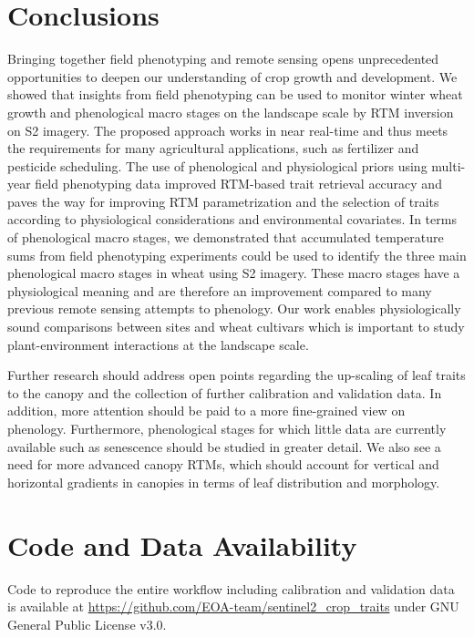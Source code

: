 \section{Conclusions}
\label{sec:conclusions}
% 
Bringing together field phenotyping and remote sensing opens unprecedented opportunities to deepen our understanding of crop growth and development.
We showed that insights from field phenotyping can be used to monitor winter wheat growth and phenological macro stages on the landscape scale by RTM inversion on S2 imagery. The proposed approach works in near real-time and thus meets the requirements for many agricultural applications, such as fertilizer and pesticide scheduling. The use of phenological and physiological priors using multi-year field phenotyping data improved RTM-based trait retrieval accuracy and paves the way for improving RTM parametrization and the selection of traits according to physiological considerations and environmental covariates. In terms of phenological macro stages, we demonstrated that accumulated temperature sums from field phenotyping experiments could be used to identify the three main phenological macro stages in wheat using S2 imagery. These macro stages have a physiological meaning and are therefore an improvement compared to many previous remote sensing attempts to phenology. Our work enables physiologically sound comparisons between sites and wheat cultivars which is important to study plant-environment interactions at the landscape scale.

Further research should address open points regarding the up-scaling of leaf traits to the canopy and the collection of further calibration and validation data. In addition, more attention should be paid to a more fine-grained view on phenology. Furthermore, phenological stages for which little data are currently available such as senescence should be studied in greater detail. We also see a need for more advanced canopy RTMs, which should account for vertical and horizontal gradients in canopies in terms of leaf distribution and morphology.

\section*{Code and Data Availability}
\label{sec:code-data-availability}
Code to reproduce the entire workflow including calibration and validation data is available at \url{https://github.com/EOA-team/sentinel2_crop_traits} under GNU General Public License v3.0.

